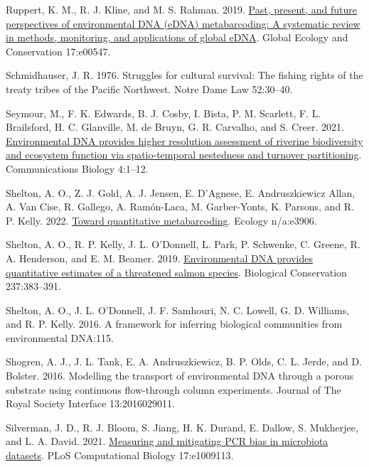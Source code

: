 \documentclass[
]{article}
\newlength{\cslhangindent}
\newlength{\cslentryspacingunit} %
\newenvironment{CSLReferences}[2] %
 {%
  \setlength{\parindent}{0pt}
  \ifodd #1
  \let\oldpar\par
  \def\par{\hangindent=\cslhangindent\oldpar}
  \fi
  \setlength{\parskip}{#2\cslentryspacingunit}
 }%
 {}
\begin{document}
\begin{CSLReferences}{1}{0}
\leavevmode{}%
Ruppert, K. M., R. J. Kline, and M. S. Rahman. 2019.
\href{https://doi.org/10.1016/j.gecco.2019.e00547}{Past, present, and
future perspectives of environmental DNA (eDNA) metabarcoding: A
systematic review in methods, monitoring, and applications of global
eDNA}. Global Ecology and Conservation 17:e00547.

\leavevmode{}%
Schmidhauser, J. R. 1976. Struggles for cultural survival: The fishing
rights of the treaty tribes of the Pacific Northwest. Notre Dame Law
52:30--40.

\leavevmode{}%
Seymour, M., F. K. Edwards, B. J. Cosby, I. Bista, P. M. Scarlett, F. L.
Brailsford, H. C. Glanville, M. de Bruyn, G. R. Carvalho, and S. Creer.
2021. \href{https://doi.org/10.1038/s42003-021-02031-2}{Environmental
DNA provides higher resolution assessment of riverine biodiversity and
ecosystem function via spatio-temporal nestedness and turnover
partitioning}. Communications Biology 4:1--12.

\leavevmode{}%
Shelton, A. O., Z. J. Gold, A. J. Jensen, E. D'Agnese, E. Andruszkiewicz
Allan, A. Van Cise, R. Gallego, A. Ramón-Laca, M. Garber-Yonts, K.
Parsons, and R. P. Kelly. 2022.
\href{https://doi.org/10.1002/ecy.3906}{Toward quantitative
metabarcoding}. Ecology n/a:e3906.

\leavevmode{}%
Shelton, A. O., R. P. Kelly, J. L. O'Donnell, L. Park, P. Schwenke, C.
Greene, R. A. Henderson, and E. M. Beamer. 2019.
\href{https://doi.org/10.1016/j.biocon.2019.07.003}{Environmental DNA
provides quantitative estimates of a threatened salmon species}.
Biological Conservation 237:383--391.

\leavevmode{}%
Shelton, A. O., J. L. O'Donnell, J. F. Samhouri, N. C. Lowell, G. D.
Williams, and R. P. Kelly. 2016. A framework for inferring biological
communities from environmental DNA:115.

\leavevmode{}%
Shogren, A. J., J. L. Tank, E. A. Andruszkiewicz, B. P. Olds, C. L.
Jerde, and D. Bolster. 2016. Modelling the transport of environmental
DNA through a porous substrate using continuous flow-through column
experiments. Journal of The Royal Society Interface 13:2016029011.

\leavevmode{}%
Silverman, J. D., R. J. Bloom, S. Jiang, H. K. Durand, E. Dallow, S.
Mukherjee, and L. A. David. 2021.
\href{https://doi.org/10.1371/journal.pcbi.1009113}{Measuring and
mitigating PCR bias in microbiota datasets}. PLoS Computational Biology
17:e1009113.


\end{CSLReferences}
\end{document}
